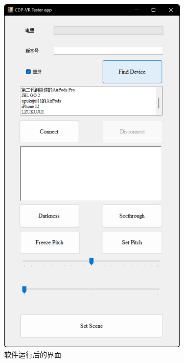 \documentclass[a4paper,10pt]{article}
\begin{document}
\begin{figure}[htbp]
			\begin{subfigure}{0.23\textwidth}
				\includegraphics[width=0.98\linewidth]{picture/VertiVR-CDP Tester FindDevice}
				\captionsetup{font=scriptsize}
				\caption{软件运行后的界面}
				\label{fig:vertivr-cdp-tester-finddevice}
			\end{subfigure}
			\begin{subfigure}{0.23\textwidth}

\end{subfigure}
\end{figure}
\end{document}
